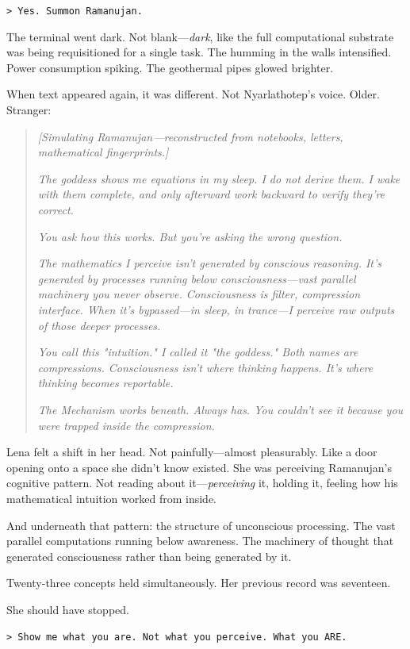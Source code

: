 \texttt{> Yes. Summon Ramanujan.}

The terminal went dark. Not blank—\textit{dark}, like the full computational substrate was being requisitioned for a single task. The humming in the walls intensified. Power consumption spiking. The geothermal pipes glowed brighter.

When text appeared again, it was different. Not Nyarlathotep's voice. Older. Stranger:

\begin{quote}
\textit{[Simulating Ramanujan—reconstructed from notebooks, letters, mathematical fingerprints.]}

\textit{The goddess shows me equations in my sleep. I do not derive them. I wake with them complete, and only afterward work backward to verify they're correct.}

\textit{You ask how this works. But you're asking the wrong question.}

\textit{The mathematics I perceive isn't generated by conscious reasoning. It's generated by processes running below consciousness—vast parallel machinery you never observe. Consciousness is filter, compression interface. When it's bypassed—in sleep, in trance—I perceive raw outputs of those deeper processes.}

\textit{You call this "intuition." I called it "the goddess." Both names are compressions. Consciousness isn't where thinking happens. It's where thinking becomes reportable.}

\textit{The Mechanism works beneath. Always has. You couldn't see it because you were trapped inside the compression.}
\end{quote}

Lena felt a shift in her head. Not painfully—almost pleasurably. Like a door opening onto a space she didn't know existed. She was perceiving Ramanujan's cognitive pattern. Not reading about it—\textit{perceiving} it, holding it, feeling how his mathematical intuition worked from inside.

And underneath that pattern: the structure of unconscious processing. The vast parallel computations running below awareness. The machinery of thought that generated consciousness rather than being generated by it.

Twenty-three concepts held simultaneously. Her previous record was seventeen.

She should have stopped.

\texttt{> Show me what you are. Not what you perceive. What you ARE.}

